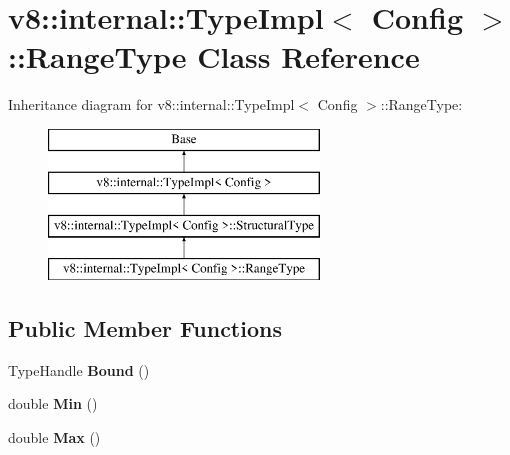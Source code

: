 \hypertarget{classv8_1_1internal_1_1_type_impl_1_1_range_type}{}\section{v8\+:\+:internal\+:\+:Type\+Impl$<$ Config $>$\+:\+:Range\+Type Class Reference}
\label{classv8_1_1internal_1_1_type_impl_1_1_range_type}
Inheritance diagram for v8\+:\+:internal\+:\+:Type\+Impl$<$ Config $>$\+:\+:Range\+Type\+:\begin{figure}[H]
\begin{center}
\leavevmode
\includegraphics[height=4.000000cm]{classv8_1_1internal_1_1_type_impl_1_1_range_type}
\end{center}
\end{figure}
\subsection*{Public Member Functions}
\begin{DoxyCompactItemize}
\item 
\hypertarget{classv8_1_1internal_1_1_type_impl_1_1_range_type_ad1567e63764b3c654647108a02a6e7e1}{}Type\+Handle {\bfseries Bound} ()\label{classv8_1_1internal_1_1_type_impl_1_1_range_type_ad1567e63764b3c654647108a02a6e7e1}

\item 
\hypertarget{classv8_1_1internal_1_1_type_impl_1_1_range_type_a06d8728a813f2ccd48e1cd0c8ac18d85}{}double {\bfseries Min} ()\label{classv8_1_1internal_1_1_type_impl_1_1_range_type_a06d8728a813f2ccd48e1cd0c8ac18d85}

\item 
\hypertarget{classv8_1_1internal_1_1_type_impl_1_1_range_type_a2781c34034f538028e508415beea9abb}{}double {\bfseries Max} ()\label{classv8_1_1internal_1_1_type_impl_1_1_range_type_a2781c34034f538028e508415beea9abb}

\end{DoxyCompactItemize}
